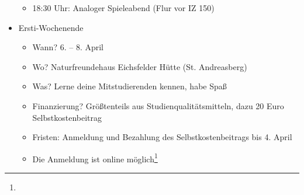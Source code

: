 \begin{itemize}
	\begin{itemize}
		\item 18:30 Uhr: Analoger Spieleabend (Flur vor IZ 150)
	\end{itemize}
	\item Ersti-Wochenende
	\begin{itemize}
		\item Wann? 6. – 8. April
		\item Wo? Naturfreundehaus Eichsfelder Hütte (St. Andreasberg)
		\item Was? Lerne deine Mitstudierenden kennen, habe Spaß 
		\item Finanzierung? Größtenteils aus Studienqualitätsmitteln, dazu 20 Euro Selbstkostenbeitrag
		\item Fristen: Anmeldung und Bezahlung des Selbstkostenbeitrags bis 4. April
		\item Die Anmeldung ist online möglich\footnote{}
	\end{itemize}
\end{itemize}